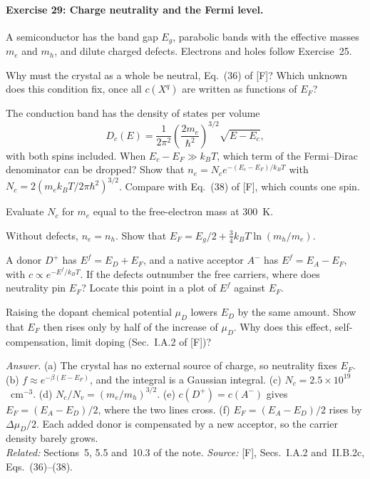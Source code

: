 \documentclass[11pt]{article}      %
\numberwithin{equation}{section}   %
\begin{document}
\paragraph{Exercise 29: Charge neutrality and the Fermi level.}
A semiconductor has the band gap $E_g$, parabolic bands with the effective masses $m_e$ and $m_h$, and dilute charged defects. Electrons and holes follow Exercise~25.
\begin{parts}
    \item Why must the crystal as a whole be neutral, Eq.~(36) of [F]? Which unknown does this condition fix, once all $c(X^q)$ are written as functions of $E_F$?
    \item The conduction band has the density of states per volume
    \begin{equation*}
        D_c(E) = \frac{1}{2\pi^2}\left(\frac{2m_e}{\hbar^2}\right)^{3/2}\sqrt{E - E_c},
    \end{equation*}
    with both spins included. When $E_c - E_F \gg k_BT$, which term of the Fermi--Dirac denominator can be dropped? Show that $n_e = N_ce^{-(E_c - E_F)/k_BT}$ with $N_c = 2(m_ek_BT/2\pi\hbar^2)^{3/2}$. Compare with Eq.~(38) of [F], which counts one spin.
    \item Evaluate $N_c$ for $m_e$ equal to the free-electron mass at $300$~K.
    \item Without defects, $n_e = n_h$. Show that $E_F = E_g/2 + \tfrac34k_BT\ln(m_h/m_e)$.
    \item A donor $D^+$ has $E^f = E_D + E_F$, and a native acceptor $A^-$ has $E^f = E_A - E_F$, with $c \propto e^{-E^f/k_BT}$. If the defects outnumber the free carriers, where does neutrality pin $E_F$? Locate this point in a plot of $E^f$ against $E_F$.
    \item Raising the dopant chemical potential $\mu_D$ lowers $E_D$ by the same amount. Show that $E_F$ then rises only by half of the increase of $\mu_D$. Why does this effect, self-compensation, limit doping (Sec.~I.A.2 of [F])?
\end{parts}
\textit{Answer.} (a) The crystal has no external source of charge, so neutrality fixes $E_F$. (b) $f \approx e^{-\beta(E - E_F)}$, and the integral is a Gaussian integral. (c) $N_c = 2.5\times10^{19}$~cm$^{-3}$. (d) $N_c/N_v = (m_e/m_h)^{3/2}$. (e) $c(D^+) = c(A^-)$ gives $E_F = (E_A - E_D)/2$, where the two lines cross. (f) $E_F = (E_A - E_D)/2$ rises by $\Delta\mu_D/2$. Each added donor is compensated by a new acceptor, so the carrier density barely grows.\\
\textit{Related:} Sections~5, 5.5 and~10.3 of the note. \textit{Source:} [F], Secs.~I.A.2 and~II.B.2c, Eqs.~(36)--(38).
\end{document}
